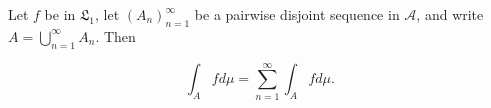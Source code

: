 Let $f$ be in $\mathfrak{L}_1$, let $(A_n)_{n=1}^{\infty}$ be a pairwise disjoint sequence in $\mathcal{A}$, and write $A = \bigcup_{n=1}^{\infty} A_n$. Then

$$\int_A f d\mu = \sum_{n=1}^{\infty} \int_A f d\mu.$$